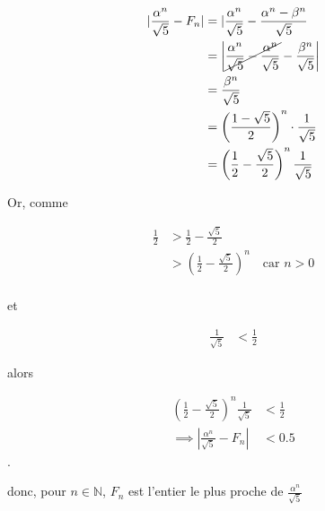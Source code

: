 \documentclass{article}
\newcommand{\N}{\mathds{N}}
\begin{document}
\begin{align*}
	| \frac{\alpha^{n}}{\sqrt{5} } - F_n | &= | \frac{\alpha^{n}}{\sqrt{5} } - \frac{\alpha^{n}-\beta^{n}}{\sqrt{5} } \\
					       &= \left| \cancel{\frac{\alpha^{n}}{\sqrt{5} }-\frac{\alpha^{n}}{\sqrt{5} }} - \frac{\beta^{n}}{\sqrt{5} } \right|\\
					       &= \frac{\beta^{n}}{\sqrt{5} } \\
					       &= \left(\frac{1-\sqrt{5} }{2}\right)^{n} \cdot \frac{1}{\sqrt{5} }\\
					       &= \left( \frac{1}{2} - \frac{\sqrt{5}}{2} \right)^{n} \frac{1}{\sqrt{5} } \\
\end{align*}

Or, comme

\begin{align*}
	\frac{1}{2} &> \frac{1}{2}-\frac{\sqrt{5} }{2} \\
		    &> \left( \frac{1}{2}-\frac{\sqrt{5} }{2} \right) ^{n}\quad\text{car $n > 0$} \\
\end{align*}

et

\begin{align*}
	\frac{1}{\sqrt{5} } &< \frac{1}{2}
\end{align*}

alors 

\begin{align*}
	\left( \frac{1}{2} - \frac{\sqrt{5}}{2} \right)^{n} \frac{1}{\sqrt{5} } &< \frac{1}{2} \\
	\implies | \frac{\alpha^{n}}{\sqrt{5} } - F_n | &< 0.5
\end{align*}.

donc, pour $n \in \N$, $F_n$ est l'entier le plus proche de $\frac{\alpha^{n}}{\sqrt{5} }$

\section{} %
\section{} %
\section{} %
\section{} %
\end{document}
